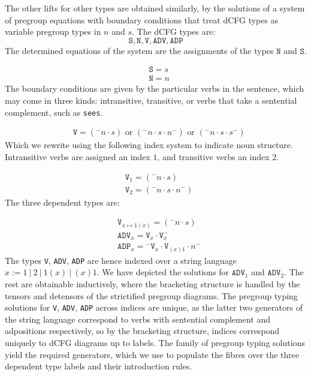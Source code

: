 \begin{myboxR}
The other lifts for other types are obtained similarly, by the solutions of a system of pregroup equations with boundary conditions that treat dCFG types as variable pregroup types in $n$ and $s$. The dCFG types are:
\[\texttt{S}, \texttt{N}, \texttt{V}, \texttt{ADV}, \texttt{ADP}\]
The determined equations of the system are the assignments of the types $\texttt{N}$ and $\texttt{S}$.

\begin{align*}
&\texttt{S} = s  \\
&\texttt{N} = n
\end{align*}
The boundary conditions are given by the particular verbs in the sentence, which may come in three kinds: intransitive, transitive, or verbs that take a sentential complement, such as \texttt{sees}.

\begin{align*}
&\texttt{V} = ({}^{-}n \cdot s) \text{ or } ({}^{-}n \cdot s \cdot n^{-}) \text{ or } ({}^{-}n \cdot s \cdot s^{-})
\end{align*}
Which we rewrite using the following index system to indicate noun structure. Intransitive verbs are assigned an index $1$, and transitive verbs an index $2$.

\begin{align*}
&\texttt{V}_1 = ({}^{-}n \cdot s)\\
&\texttt{V}_2 = ({}^{-}n \cdot s \cdot n^{-})
\end{align*}
The three dependent types are:

\begin{align*}
&\texttt{V}_{x \mapsto 1(x)} = ({}^{-}n \cdot s)\\
&\texttt{ADV}_x = \texttt{V}_x \cdot \texttt{V}_x^{-}\\
&\texttt{ADP}_x = {}^{-}\texttt{V}_x \cdot \texttt{V}_{(x)1} \cdot n^{-}
\end{align*}
The types \texttt{V}, \texttt{ADV}, \texttt{ADP} are hence indexed over a string language $x := 1 \ | \ 2 \ | \ 1(x) \ | \ (x)1$. We have depicted the solutions for $\texttt{ADV}_1$ and $\texttt{ADV}_2$. The rest are obtainable inductively, where the bracketing structure is handled by the tensors and detensors of the strictified pregroup diagrams. The pregroup typing solutions for \texttt{V}, \texttt{ADV}, \texttt{ADP} across indices are unique, as the latter two generators of the string language correspond to verbs with sentential complement and adpositions respectively, so by the bracketing structure, indices correspond uniquely to dCFG diagrams up to labels. The family of pregroup typing solutions yield the required generators, which we use to populate the fibres over the three dependent type labels and their introduction rules.
\end{myboxR}


